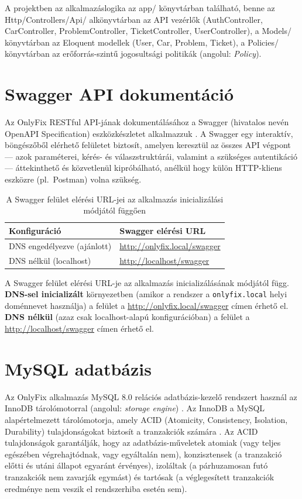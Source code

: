 \documentclass[colorlinks]{thesis-kando}
\begin{document}
A projektben az alkalmazáslogika az app/ könyvtárban található, benne az Http/Controllers/Api/ alkönyvtárban az API vezérlők (AuthController, CarController, ProblemController, TicketController, UserController), a Models/ könyvtárban az Eloquent modellek (User, Car, Problem, Ticket), a Policies/ könyvtárban az erőforrás-szintű jogosultsági politikák (angolul: \emph{Policy}).

\section{Swagger API dokumentáció}

Az OnlyFix RESTful API-jának dokumentálásához a Swagger (hivatalos nevén OpenAPI Specification) eszközkészletet alkalmazzuk \cite{ref21}. A Swagger egy interaktív, böngészőből elérhető felületet biztosít, amelyen keresztül az összes API végpont --- azok paraméterei, kérés- és válaszstruktúrái, valamint a szükséges autentikáció --- áttekinthető és közvetlenül kipróbálható, anélkül hogy külön HTTP-kliens eszközre (pl.\ Postman) volna szükség.

\begin{table}[ht]
	\centering
	\begin{tabular}{ll}
		\hline
		\textbf{Konfiguráció} & \textbf{Swagger elérési URL} \\ \hline
		DNS engedélyezve (ajánlott) & \url{http://onlyfix.local/swagger} \\
		DNS nélkül (localhost) & \url{http://localhost/swagger} \\ \hline
	\end{tabular}
	\caption{A Swagger felület elérési URL-jei az alkalmazás inicializálási módjától függően}
	\label{tab-swagger}
\end{table}

A Swagger felület elérési URL-je az alkalmazás inicializálásának módjától függ. \textbf{DNS-sel inicializált} környezetben (amikor a rendszer a \texttt{onlyfix.local} helyi doménnevet használja) a felület a \url{http://onlyfix.local/swagger} címen érhető el. \textbf{DNS nélkül} (azaz csak localhost-alapú konfigurációban) a felület a \url{http://localhost/swagger} címen érhető el.

\section{MySQL adatbázis}

Az OnlyFix alkalmazás MySQL 8.0 relációs adatbázis-kezelő rendszert használ az InnoDB tárolómotorral (angolul: \emph{storage engine}) \cite{ref16}. Az InnoDB a MySQL alapértelmezett tárolómotorja, amely ACID (Atomicity, Consistency, Isolation, Durability) tulajdonságokat biztosít a tranzakciók számára \cite{ref16}. Az ACID tulajdonságok garantálják, hogy az adatbázis-műveletek atomiak (vagy teljes egészében végrehajtódnak, vagy egyáltalán nem), konzisztensek (a tranzakció előtti és utáni állapot egyaránt érvényes), izoláltak (a párhuzamosan futó tranzakciók nem zavarják egymást) és tartósak (a véglegesített tranzakciók eredménye nem veszik el rendszerhiba esetén sem).
\end{document}
